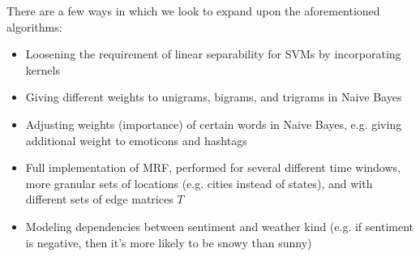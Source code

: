 There are a few ways in which we look to expand upon the aforementioned algorithms:

\begin{itemize}
\item Loosening the requirement of linear separability for SVMs by incorporating kernels
\item Giving different weights to unigrams, bigrams, and trigrams in Naive Bayes
\item Adjusting weights (importance) of certain words in Naive Bayes, e.g. giving additional weight to emoticons and hashtags
\item Full implementation of MRF, performed for several different time windows, more granular sets of locations (e.g. cities instead of states), and with different sets of edge matrices $T$
\item Modeling dependencies between sentiment and weather kind (e.g. if sentiment is negative, then it's more likely to be snowy than sunny)
\end{itemize}
